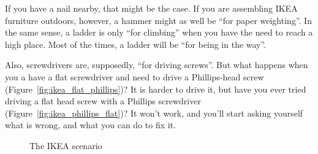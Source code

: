\documentclass{article}
\begin{document}
If you have a nail nearby, that might be the case. If you are assembling IKEA
furniture outdoors, however, a hammer might as well be ``for paper weighting''.
In the same sense, a ladder is only ``for climbing'' when you have the need to
reach a high place. Most of the times, a ladder will be
``for being in the way''.

Also, screwdrivers are, supposedly, ``for driving screws''. But what happens
when you a have a flat screwdriver and need to drive a Phillips-head screw
(Figure~\ref{fig:ikea_flat_phillips})? It is harder to drive it, but have you
ever tried driving a flat head screw with a Phillips screwdriver
(Figure~\ref{fig:ikea_phillips_flat})? It won't work, and you'll start asking
yourself what is wrong, and what you can do to fix it.

\begin{figure}[h]
  \centering
  \qquad
  \caption{The IKEA scenario}
\end{figure}
\end{document}
